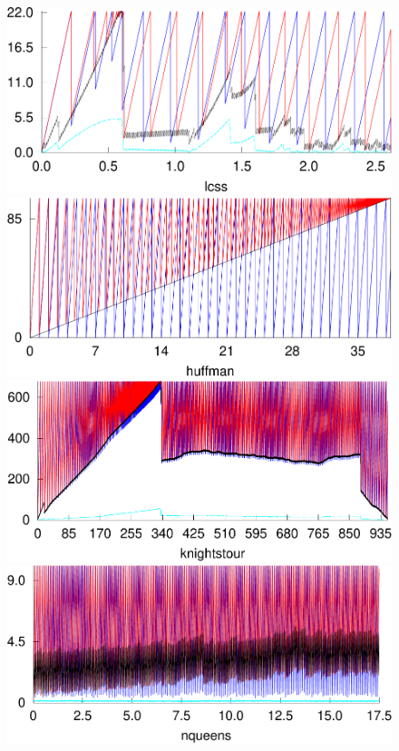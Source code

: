 \documentclass[9pt,preprint,nonatbib]{sigplanconf}
\begin{document}
\begin{figure}[t!]
  \includegraphics[width=\wdh]{lcss.pdf}
  \includegraphics[width=\wdh]{huffman.pdf}\\
  \includegraphics[width=\wdh]{knightstour.pdf}
  \includegraphics[width=\wdh]{nqueens.pdf}

\end{figure}
\end{document}
